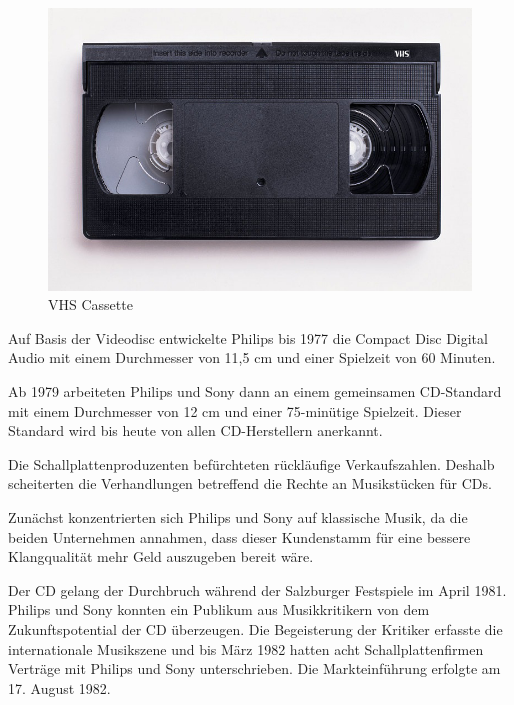 \begin{figure}[h]
\begin{center}
\begin{minipage}[t]{0.3\textwidth}
            \begin{center}
                \includegraphics[height=0.1\textheight]{Bilder/Optische_Datentraeger_Die_Compact_Disc/Geschichte/vhs.png}
                \caption[VHS cassette \newline \url{https://upload.wikimedia.org/wikipedia/commons/6/67/VHS-cassette.jpg} (zuletzt aufgerufen am 19.09.2015)]{VHS Cassette}
                \label{fig:vhs}
            \end{center}
        \end{minipage}
    \end{center}
\end{figure}

Auf Basis der Videodisc entwickelte Philips bis 1977 die Compact Disc Digital
Audio mit einem Durchmesser von 11,5 cm und einer Spielzeit von 60 Minuten.

Ab 1979 arbeiteten Philips und Sony dann an einem gemeinsamen CD-Standard mit
einem Durchmesser von 12 cm und einer 75-minütige Spielzeit. Dieser Standard
wird bis heute von allen CD-Herstellern anerkannt. \cite{cds}

Die Schallplattenproduzenten befürchteten rückläufige Verkaufszahlen. Deshalb
scheiterten die Verhandlungen betreffend die Rechte an Musikstücken für CDs.

Zunächst konzentrierten sich Philips und Sony auf klassische Musik, da die
beiden Unternehmen annahmen, dass dieser Kundenstamm für eine bessere
Klangqualität mehr Geld auszugeben bereit wäre.

Der CD gelang der Durchbruch während der Salzburger Festspiele im April 1981.
Philips und Sony konnten ein Publikum aus Musikkritikern von dem
Zukunftspotential der CD überzeugen. Die Begeisterung der Kritiker erfasste die
internationale Musikszene und bis März 1982 hatten acht Schallplattenfirmen
Verträge mit Philips und Sony unterschrieben. Die Markteinführung erfolgte am
17. August 1982. \cite{cuz}

